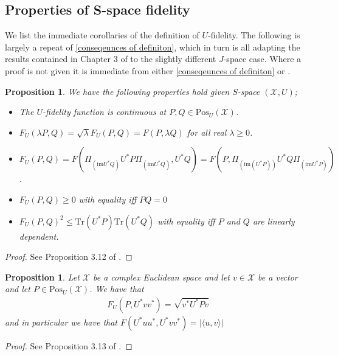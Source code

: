 \documentclass{amsart}
\numberwithin{equation}{section}
\newtheorem{proposition}[theorem]{Proposition}
\theoremstyle{definition}
\theoremstyle{plain}
\theoremstyle{solutionstyle}
\begin{document}
\subsection{Properties of S-space fidelity}
We list the immediate corollaries of the definition of $U$-fidelity. The following is largely a repeat of \ref{conseqeunces of definiton}, which in turn is all adapting the results contained in Chapter 3 of \cite{Watrous_2018} to the slightly different $J$-space case. Where a proof is not given it is immediate from either \ref{conseqeunces of definiton} or \cite{Watrous_2018}.
\begin{proposition}
   We have the following properties hold given $S$-space $(\mathcal{X},U)$;
    \begin{itemize}
    
        \item The $U$-fidelity function is continuous at $P,Q \in \mathrm{Pos}_U(\mathcal{X})$.
        \item $F_U(\lambda P,Q)=\sqrt{\lambda}F_U(P,Q)=F(P,\lambda Q)$ for all real $\lambda\geq 0$.
        \item $F_U(P,Q)=F(\Pi_{(\mathrm{im}U^*Q)}U^*P\Pi_{(\mathrm{im}U^*Q)}, U^*Q)=F(P,\Pi_{(\mathrm{im}(U^*P))}U^*Q\Pi_{(\mathrm{im}U^*P)})$.
        \item $F_U(P,Q)\geq 0$ with equality iff $PQ=0$
        \item $F_U(P,Q)^2\leq \mathrm{Tr}(U^*P)\mathrm{Tr}(U^*Q)$ with equality iff $P$ and $Q$ are linearly dependent.
    \end{itemize}
\end{proposition}
\begin{proof}
    See Proposition 3.12 of \cite{Watrous_2018}.
\end{proof}

\begin{proposition}
    Let $\mathcal{X}$ be a complex Euclidean space and let $v\in \mathcal{X}$ be a vector and let $P\in \mathrm{Pos}_U(\mathcal{X})$. We have that 
    \begin{align*}
        F_U(P, U^*vv^*)=\sqrt{v^*U^*Pv}
    \end{align*}
    and in particular we have that $F(U^*uu^*, U^*vv^*)=|\langle u,v\rangle |$
\end{proposition}
\begin{proof}
    See Proposition 3.13 of \cite{Watrous_2018}.
\end{proof}
\end{document}
